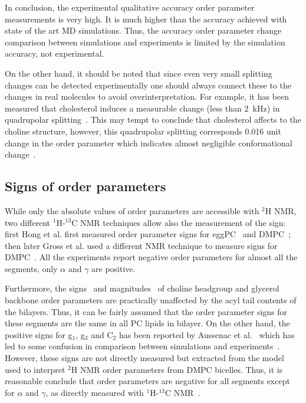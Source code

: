 \documentclass[aps,prl,superscriptaddress,twocolumn]{revtex4}
\begin{document}
In conclusion, the experimental qualitative accuracy order parameter measurements is very high.
It is much higher than the accuracy achieved with state of the art MD simulations.
Thus, the accuracy order parameter change comparison between simulations and experiments is
limited by the simulation accuracy, not experimental. 

On the other hand, it should be noted that since even very small splitting changes can 
be detected experimentally one should always connect these to the changes in real molecules
to avoid overinterpretation. For example, it has been measured that cholesterol induces 
a measurable change (less than 2~kHz) in  quadrupolar splitting~\cite{brown78}. This may tempt to conclude that
cholesterol affects to the choline structure, however, this quadrupolar splitting corresponds
0.016 unit change in the order parameter which indicates almost negligible conformational change~\cite{botan15}.


\subsection{Signs of order parameters}\label{signSECTION}

While only the absolute values of order parameters are accessible with $^2$H NMR, two different 
$^1$H-$^{13}$C NMR techniques allow also the measurement of the sign: 
first Hong et al. first measured order parameter signs for eggPC~\cite{hong95a} and DMPC~\cite{hong95b}; 
then later Gross et al. used a different NMR technique to measure signs for DMPC~\cite{gross97}. 
All the experiments report negative order parameters for almost all the segments, only $\alpha$ and $\gamma$ are positive.

Furthermore, the signs~\cite{hong95a,hong95b,gross97}  and magnitudes~\cite{gally81,ferreira13,botan15} of choline headgroup 
and glycerol backbone order parameters are practically unaffected by the acyl tail contents of the bilayers. 
Thus, it can be fairly assumed that the order parameter signs for these segments are the same in all PC lipids in bilayer. 
On the other hand, the positive signs for g$_1$, g$_3$ and C$_2$ has been reported by Aussenac et al.~\cite{aussenac03} 
which has led to some confusion in comparison between simulations and experiments~\cite{hogberg08}. 
However, these signs are not directly measured but extracted from the model used to interpret 
$^2$H NMR order parameters from DMPC bicelles. Thus, it is reasonable conclude that 
order parameters are negative for all segments except for $\alpha$ and $\gamma$, as 
directly measured with $^1$H-$^{13}$C NMR~\cite{hong95a,hong95b,gross97}.
\end{document}
